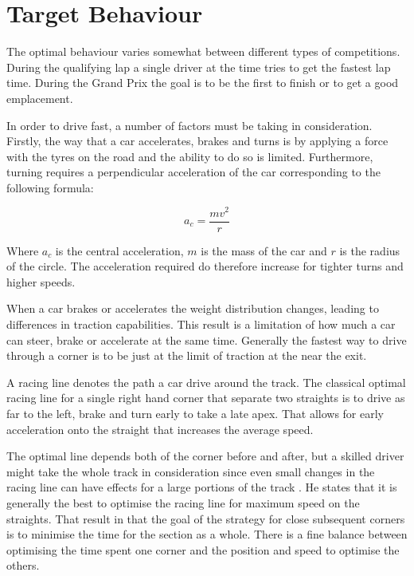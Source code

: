 \section{Target Behaviour}
The optimal behaviour varies somewhat between different types of competitions. During the qualifying lap a single driver at the time tries to get the fastest lap time. During the Grand Prix the goal is to be the first to finish or to get a good emplacement. 

In order to drive fast, a number of factors must be taking in consideration. Firstly, the way that a car accelerates, brakes and turns is by applying a force with the tyres on the road and the ability to do so is limited\cite{beckman_traction_budget}. Furthermore, turning requires a perpendicular acceleration of the car corresponding to the following formula:

\[
a_c = \frac{mv^2}{r}
\]

Where $a_c$ is the central acceleration, $m$ is the mass of the car and $r$ is the radius of the circle\cite{beckman_circular_motion}. The acceleration required do therefore increase for tighter turns and higher speeds.

When a car brakes or accelerates the weight distribution changes, leading to differences in traction capabilities. This result is a limitation of how much a car can steer, brake or accelerate at the same time\cite{beckman_weight_transfer}. Generally the fastest way to drive through a corner is to be just at the limit of traction at the near the exit\cite{beckman_racing_line_intro}.  

A racing line denotes the path a car drive around the track. The classical optimal racing line for a single right hand corner that separate two straights is to drive as far to the left, brake and turn early to take a late apex\cite{beckman_racing_line_intro}. That allows for early acceleration onto the straight that increases the average speed.

The optimal line depends both of the corner before and after, but a skilled driver might take the whole track in consideration since even small changes in the racing line can have effects for a large portions of the track \cite{beckman_racing_line_intro}. He states that it is generally the best to optimise the racing line for maximum speed on the straights. That result in that the goal of the strategy for close subsequent corners is to minimise the time for the section as a whole. There is a fine balance between optimising the time spent one corner and the position and speed to optimise the others.


